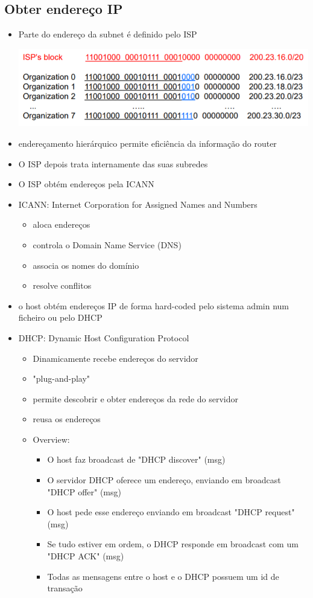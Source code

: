 \documentclass{article}
\begin{document}
\subsection{Obter endereço IP}
\begin{itemize}
    \item Parte do endereço da subnet é definido pelo ISP
    \begin{center}
        \includegraphics[width=14cm]{images/RCOM25.png}
    \end{center}
    \item endereçamento hierárquico permite eficiência da informação do router
    \item O ISP depois trata internamente das suas subredes
    \item O ISP obtém endereços pela ICANN
    \item ICANN: Internet Corporation for Assigned Names and Numbers
    \begin{itemize}
        \item aloca endereços
        \item controla o Domain Name Service (DNS)
        \item associa os nomes do domínio
        \item resolve conflitos
    \end{itemize}
    \item o host obtém endereços IP de forma hard-coded pelo sistema admin num ficheiro ou pelo DHCP
    \item DHCP: Dynamic Host Configuration Protocol
    \begin{itemize}
        \item Dinamicamente recebe endereços do servidor
        \item "plug-and-play"
        \item permite descobrir e obter endereços da rede do servidor
        \item reusa os endereços
        \item Overview:
        \begin{itemize}
            \item O host faz broadcast de "DHCP discover" (msg)
            \item O servidor DHCP oferece um endereço, enviando em broadcast "DHCP offer" (msg)
			\item O host pede esse endereço enviando em broadcast "DHCP request" (msg)
            \item Se tudo estiver em ordem, o DHCP responde em broadcast com um "DHCP ACK" (msg)
            \item Todas as mensagens entre o host e o DHCP possuem um id de transação
        \end{itemize}
    \end{itemize}
\end{itemize}
\end{document}
